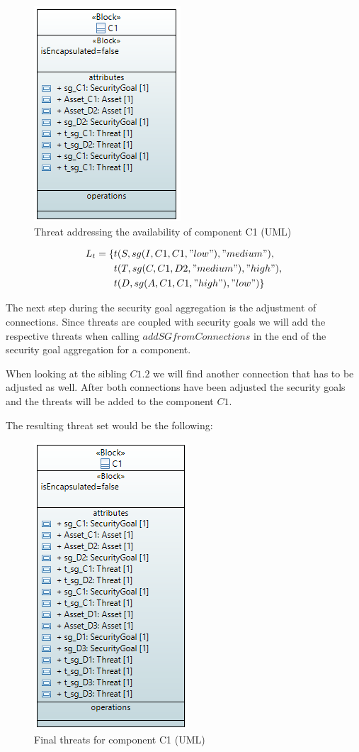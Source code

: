 \begin{figure}[H]
\centering
\includegraphics[scale=0.9]{pictures/block_c1_threat_availability}
\caption{Threat addressing the availability of component C1 (UML)}
\end{figure}

\begin{align*}
L_t = \{&t(S, sg(I,C1,C1,"low"), "medium"), \\
&t(T, sg(C,C1,D2,"medium"), "high"), \\
&t(D, sg(A,C1,C1,"high"), "low")\}
\end{align*}

The next step during the security goal aggregation is the adjustment of connections. Since threats are coupled with security goals we will add the respective threats when calling $addSGfromConnections$ in the end of the security goal aggregation for a component.

When looking at the sibling $C1.2$ we will find another connection that has to be adjusted as well. After both connections have been adjusted the security goals and the threats will be added to the component $C1$. 

The resulting threat set would be the following:

\begin{figure}[H]
\centering
\includegraphics[scale=0.9]{pictures/block_c1_threat_final}
\caption{Final threats for component C1 (UML)}
\end{figure}


